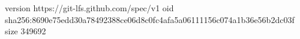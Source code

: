version https://git-lfs.github.com/spec/v1
oid sha256:8690e75edd30a78492388ce06d8c0fc4afa5a06111156c074a1b36e56b2dc03f
size 349692
